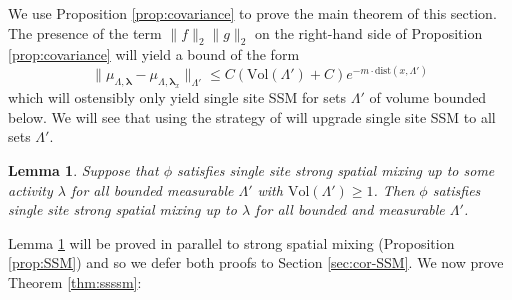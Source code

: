 \documentclass[10pt]{amsart}
\newtheorem{lemma}[theorem]{Lemma}
\theoremstyle{definition}
\theoremstyle{remark}
\newcommand{\blambda}{{\boldsymbol{\lambda}}}
\newcommand{\dist}{\mathrm{dist}}
\newcommand{\vol}{\mathrm{Vol}}
\begin{document}
	We use Proposition \ref{prop:covariance} to prove the main theorem of this section.  The presence of the term $\|f\|_2 \|g\|_2$ on the right-hand side of Proposition \ref{prop:covariance} will yield a bound of the form $$\| \mu_{\Lambda,\blambda} - \mu_{\Lambda,\blambda_x}\|_{\Lambda'} \leq C(\vol(\Lambda') + C) e^{-m\cdot\dist(x,\Lambda')}$$
	which will ostensibly only yield single site SSM for sets $\Lambda'$ of volume bounded below.  We will see that using the strategy of \cite{michelen2022strong} will upgrade single site SSM to all sets $\Lambda'$.
	
	\begin{lemma}\label{lem:upgrade-to-small-vol}
		Suppose that $\phi$ satisfies single site strong spatial mixing up to some activity $\lambda$ for all bounded measurable $\Lambda'$ with $\vol(\Lambda') \geq 1$.  Then $\phi$ satisfies single site strong spatial mixing up to $\lambda$ for all bounded and measurable $\Lambda'$.
	\end{lemma}
	
	Lemma \ref{lem:upgrade-to-small-vol} will be proved in parallel to strong spatial mixing (Proposition \ref{prop:SSM}) and so we defer both proofs to  Section \ref{sec:cor-SSM}.
	We now prove Theorem \ref{thm:ssssm}:
	
\end{document}

